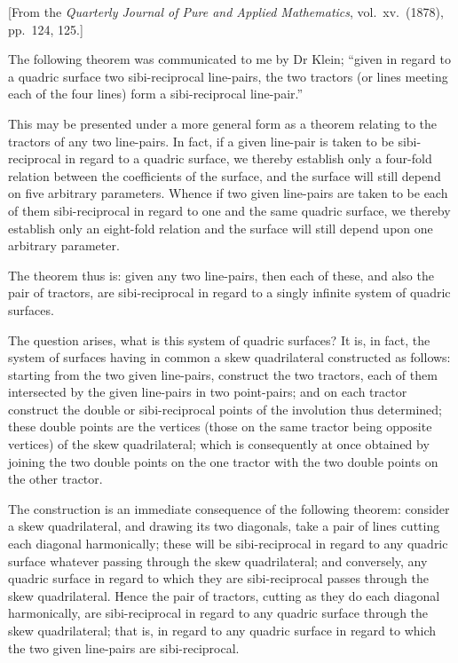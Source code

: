 \documentclass[12pt,a4paper]{article}
\theoremstyle{cayley}
\theoremstyle{definition}
\numberwithin{equation}{section}
\begin{document}
[From the \textit{Quarterly Journal of Pure and Applied Mathematics}, vol.\ xv.\ (1878), pp.\ 124, 125.]

The following theorem was communicated to me by Dr Klein; ``given in regard to a quadric surface two sibi-reciprocal line-pairs, the two tractors (or lines meeting each of the four lines) form a sibi-reciprocal line-pair.''

This may be presented under a more general form as a theorem relating to the tractors of any two line-pairs. In fact, if a given line-pair is taken to be sibi-reciprocal in regard to a quadric surface, we thereby establish only a four-fold relation between the coefficients of the surface, and the surface will still depend on five arbitrary parameters. Whence if two given line-pairs are taken to be each of them sibi-reciprocal in regard to one and the same quadric surface, we thereby establish only an eight-fold relation and the surface will still depend upon one arbitrary parameter.

The theorem thus is: given any two line-pairs, then each of these, and also the pair of tractors, are sibi-reciprocal in regard to a singly infinite system of quadric surfaces.

The question arises, what is this system of quadric surfaces? It is, in fact, the system of surfaces having in common a skew quadrilateral constructed as follows: starting from the two given line-pairs, construct the two tractors, each of them intersected by the given line-pairs in two point-pairs; and on each tractor construct the double or sibi-reciprocal points of the involution thus determined; these double points are the vertices (those on the same tractor being opposite vertices) of the skew quadrilateral; which is consequently at once obtained by joining the two double points on the one tractor with the two double points on the other tractor.

The construction is an immediate consequence of the following theorem: consider a skew quadrilateral, and drawing its two diagonals, take a pair of lines cutting each diagonal harmonically; these will be sibi-reciprocal in regard to any quadric surface whatever passing through the skew quadrilateral; and conversely, any quadric surface in regard to which they are sibi-reciprocal passes through the skew quadrilateral. Hence the pair of tractors, cutting as they do each diagonal harmonically, are sibi-reciprocal in regard to any quadric surface through the skew quadrilateral; that is, in regard to any quadric surface in regard to which the two given line-pairs are sibi-reciprocal.
\end{document}
